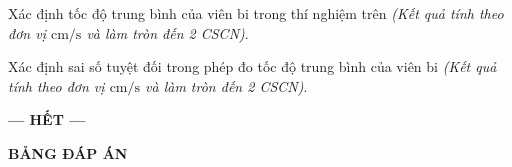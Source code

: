 \begin{ex}
	Xác định tốc độ trung bình của viên bi trong thí nghiệm trên \textit{(Kết quả tính theo đơn vị $\si{\centi\meter/\second}$ và làm tròn đến 2 CSCN)}.
\end{ex}
\begin{ex}
	Xác định sai số tuyệt đối trong phép đo tốc độ trung bình của viên bi \textit{(Kết quả tính theo đơn vị $\si{\centi\meter/\second}$ và làm tròn đến 2 CSCN)}.
\end{ex}
\begin{center}
	\textbf{--- HẾT ---}
\end{center}
\newpage
\setcounter{section}{0}
\begin{center}
	\textbf{\large BẢNG ĐÁP ÁN}
\end{center}
\section{}
\section{}
\section{}

